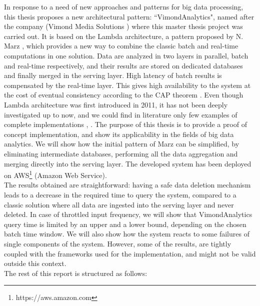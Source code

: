 In response to a need of new approaches and patterns for big data processing, this thesis proposes a new architectural pattern: ``VimondAnalytics", named after the company (Vimond Media Solutions \cite{bib1}) where this master thesis project was carried out. It is based on the Lambda architecture, a pattern proposed by N. Marz \cite{bib2}, which provides a new way to combine the classic batch and real-time computations in one solution. Data are analyzed in two layers in parallel, batch and real-time respectively, and their results are stored on dedicated databases and finally merged in the serving layer. High latency of batch results is compensated by the real-time layer. This gives high availability to the system at the cost of eventual consistency according to the CAP theorem \cite{bib33}. Even though Lambda architecture was first introduced in 2011, it has not been deeply investigated up to now, and we could find in literature only few examples of complete implementations \cite{bib30}, \cite{bib31}. The purpose of this thesis is to provide a proof of concept implementation, and show its applicability in the fields of big data analytics. We will show how the initial pattern of Marz can be simplified, by eliminating intermediate databases, performing all the data aggregation and merging directly into the serving layer. The developed system has been deployed on AWS\footnote{https://aws.amazon.com} (Amazon Web Service). \\
The results obtained are straightforward: having a safe data deletion mechanism leads to a decrease in the required time to query the system, compared to a classic solution where all data are ingested into the serving layer and never deleted. In case of throttled input frequency, we will show that VimondAnalytics query time is limited by an upper and a lower bound, depending on the chosen batch time window. We will also show how the system reacts to some failures of single components of the system. However, some of the results, are tightly coupled with the frameworks used for the implementation, and might not be valid outside this context.\\
The rest of this report is structured as follows:
